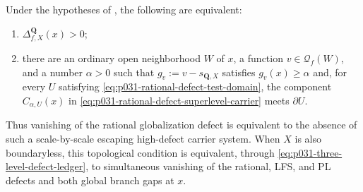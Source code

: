 \begin{corollary}
\label{cor:p031-rational-defect-escape-characterization}
Under the hypotheses of , the
following are equivalent:
\begin{enumerate}[label=\textup{(\roman*)}]
\item
$\Delta^{\mathbf Q}_{f,X}(x)>0$;
\item
there are an ordinary open neighborhood $W$ of $x$, a function
$v\in\mathcal Q_f(W)$, and a number $\alpha>0$ such that
$g_v:=v-s_{\mathbf Q,X}$ satisfies $g_v(x)\geq\alpha$ and, for every $U$
satisfying
\eqref{eq:p031-rational-defect-test-domain}, the component
$C_{\alpha,U}(x)$ in \eqref{eq:p031-rational-defect-superlevel-carrier}
meets $\partial U$.
\end{enumerate}
Thus vanishing of the rational globalization defect is equivalent to the
absence of such a scale-by-scale escaping high-defect carrier system.  When
$X$ is also
boundaryless, this topological condition is equivalent, through
\eqref{eq:p031-three-level-defect-ledger}, to simultaneous vanishing of the
rational, LFS, and PL defects and both global branch gaps at $x$.
\end{corollary}
